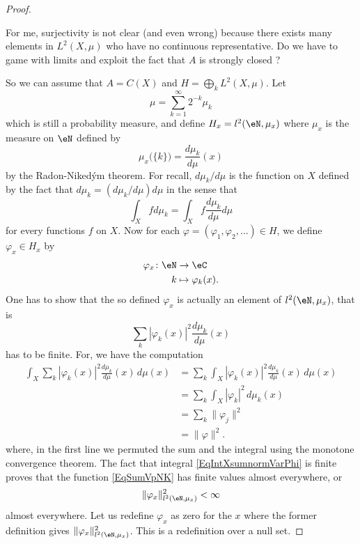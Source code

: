 \begin{proof}
\begin{probleme}
		For me, surjectivity is not clear (and even wrong) because there exists many elements in $L^2(X,\mu)$ who have no continuous representative. Do we have to game with limits and exploit the fact that $A$ is strongly closed ?

		\end{probleme}
	So we can assume that $A=C(X)$ and $H=\bigoplus_kL^2(X,\mu)$. Let 
	\begin{equation}
		\mu=\sum_{k=1}^{\infty}2^{-k}\mu_k
	\end{equation}
	which is still a probability measure, and define $H_x=l^2(\eN,\mu_x)$ where $\mu_x$ is the measure on $\eN$ defined by
	\begin{equation}
		\mu_x\big( \{ k \} \big)=\frac{ d\mu_k }{ d\mu }(x)
	\end{equation}
	by the Radon-Niked\'ym theorem. For recall, $d\mu_k/d\mu$ is the function on $X$ defined by the fact that $d\mu_k=(d\mu_k/d\mu)d\mu$ in the sense that
	\begin{equation}
		\int_Xfd\mu_k=\int_Xf\frac{ d\mu_k }{ d\mu }d\mu
	\end{equation}
	for every functions $f$ on $X$. Now for each $\varphi=(\varphi_1,\varphi_2,\ldots)\in H$, we define $\varphi_x\in H_x$ by
	\begin{equation}
	\begin{aligned}
	 \varphi_x\colon \eN&\to \eC \\ 
	   k&\mapsto \varphi_k(x). 
	\end{aligned}
	\end{equation}
	One has to show that the so defined $\varphi_x$ is actually an element of $l^2(\eN,\mu_x)$, that is 
	\begin{equation}		\label{EqSumVpNK}
		\sum_k| \varphi_k(x) |^2\frac{ d\mu_k }{ d\mu }(x)
	\end{equation}
	has to be finite. For, we have the computation
	\begin{equation}		\label{EqIntXsumnormVarPhi}
	\begin{split}
		\int_X\sum_k| \varphi_k(x) |^2\frac{ d\mu_k }{ d\mu }(x)\,d\mu(x)	
			&=\sum_k\int_X| \varphi_k(x) |^2\frac{ d\mu_k }{ d\mu }(x)\,d\mu(x)\\
			& = \sum_k\int_X| \varphi_k |^2\,d\mu_k(x)\\
			& = \sum_k\| \varphi_j \|^2\\
			& = \| \varphi \|^2.		
	\end{split}
	\end{equation}
	where, in the first line we permuted the sum and the integral using the monotone convergence theorem. The fact that integral \eqref{EqIntXsumnormVarPhi} is finite proves that the function \eqref{EqSumVpNK} has finite values almost everywhere, or 
	\begin{equation}
		\| \varphi_x \|^2_{l^2(\eN,\mu_x)}<\infty
	\end{equation}
	almost everywhere. Let us redefine $\varphi_x$ as zero for the $x$ where the former definition gives $\| \varphi_x \|^2_{l^2(\eN,\mu_x)}$. This is a redefinition over a null set.


\end{proof}
